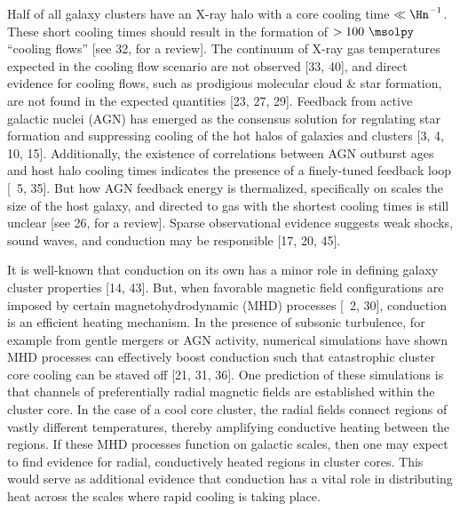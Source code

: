 \documentclass[12pt]{article}
\begin{document}
\justification

Half of all galaxy clusters have an X-ray halo with a core cooling
time $\ll \Hn^{-1}$. These short cooling times should result in the
formation of $> 100 ~\msolpy$ ``cooling flows'' [see 32, for a
  review]. The continuum of X-ray gas temperatures expected in the
cooling flow scenario are not observed [33, 40], and direct evidence
for cooling flows, such as prodigious molecular cloud \& star
formation, are not found in the expected quantities [23, 27, 29].
Feedback from active galactic nuclei (AGN) has emerged as the
consensus solution for regulating star formation and suppressing
cooling of the hot halos of galaxies and clusters [3, 4, 10, 15].
Additionally, the existence of correlations between AGN outburst ages
and host halo cooling times indicates the presence of a finely-tuned
feedback loop [\ie\ 5, 35]. But how AGN feedback energy is
thermalized, specifically on scales the size of the host galaxy, and
directed to gas with the shortest cooling times is still unclear [see
  26, for a review]. Sparse observational evidence suggests weak
shocks, sound waves, and conduction may be responsible [17, 20, 45].

It is well-known that conduction on its own has a minor role in
defining galaxy cluster properties [14, 43]. But, when favorable
magnetic field configurations are imposed by certain
magnetohydrodynamic (MHD) processes [\eg\ 2, 30], conduction is an
efficient heating mechanism. In the presence of subsonic turbulence,
for example from gentle mergers or AGN activity, numerical simulations
have shown MHD processes can effectively boost conduction such that
catastrophic cluster core cooling can be staved off [21, 31, 36]. One
prediction of these simulations is that channels of preferentially
radial magnetic fields are established within the cluster core. In the
case of a cool core cluster, the radial fields connect regions of
vastly different temperatures, thereby amplifying conductive heating
between the regions. If these MHD processes function on galactic
scales, then one may expect to find evidence for radial, conductively
heated regions in cluster cores. This would serve as additional
evidence that conduction has a vital role in distributing heat across
the scales where rapid cooling is taking place.
\end{document}
